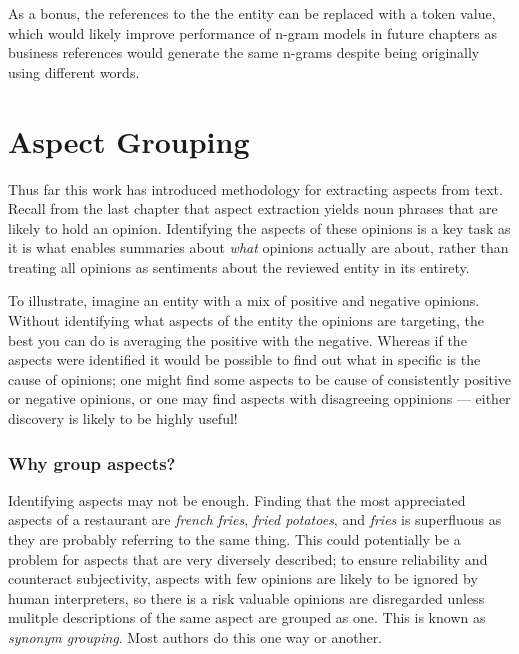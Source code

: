 \documentclass[a4paper,11pt]{kth-mag}
\begin{document}
As a bonus, the references to the the entity can be replaced with a token value, which would likely improve
performance of n-gram models in future chapters as business references would generate the same n-grams despite being originally using different words.





\chapter{Aspect Grouping}
\label{sec:aspect_grouping}
Thus far this work has introduced methodology for extracting aspects from text.
Recall from the last chapter that aspect extraction yields noun phrases that are likely
to hold an opinion.
Identifying the aspects of these opinions is a key task as it is what enables
summaries about \emph{what} opinions actually are about, rather than treating all opinions
as sentiments about the reviewed entity in its entirety.

To illustrate, imagine an entity with a mix of positive and negative opinions.
Without identifying what aspects of the entity the opinions are targeting, the best
you can do is averaging the positive with the negative.
Whereas if the aspects were identified 
it would be possible to find out what in specific is the cause of opinions;
one might find some aspects to be cause of consistently positive or negative opinions,
or one may find aspects with disagreeing oppinions
--- either discovery is likely to be highly useful!

\subsection{Why group aspects?}
Identifying aspects may not be enough. Finding that the
most appreciated aspects of a restaurant are \emph{french fries},
\emph{fried potatoes}, and \emph{fries} is superfluous as they are
probably referring to the same thing.
This could potentially be a problem for aspects that are very diversely described;
to ensure reliability and counteract subjectivity, aspects with few opinions are
likely to be ignored by human interpreters, so there is a risk valuable opinions are disregarded unless
mulitple descriptions of the same aspect are grouped as one. This is known as \emph{synonym grouping}\cite{}.
Most authors do this one way or another.
\end{document}
